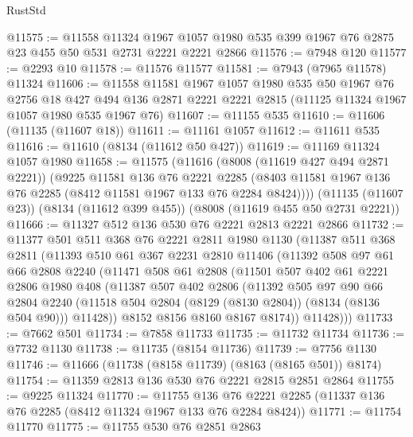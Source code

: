 \begin{lexlean}{RustStd}
\begin{coremodule}
@11575 := @11558
    @11324
    @1967
    @1057
    @1980
    @535
    @399
    @1967
    @76
    @2875
    @23
    @455
    @50
    @531
    @2731
    @2221
    @2221
    @2866
@11576 := @7948 @120
@11577 := @2293 @10
@11578 := @11576 @11577
@11581 := @7943 (@7965 @11578) @11324
@11606 := @11558
    @11581
    @1967
    @1057
    @1980
    @535
    @50
    @1967
    @76
    @2756
    @18
    @427
    @494
    @136
    @2871
    @2221
    @2221
    @2815
    (@11125 @11324 @1967 @1057 @1980 @535 @1967 @76)
@11607 := @11155 @535
@11610 := @11606 (@11135 (@11607 @18))
@11611 := @11161 @1057
@11612 := @11611 @535
@11616 := @11610 (@8134 (@11612 @50 @427))
@11619 := @11169 @11324 @1057 @1980
@11658 := @11575
    (@11616
      (@8008 (@11619 @427 @494 @2871 @2221))
      (@9225
        @11581
        @136
        @76
        @2221
        @2285
        (@8403 @11581 @1967 @136 @76 @2285 (@8412 @11581 @1967 @133 @76 @2284 @8424))))
    (@11135 (@11607 @23))
    (@8134 (@11612 @399 @455))
    (@8008 (@11619 @455 @50 @2731 @2221))
@11666 := @11327 @512 @136 @530 @76 @2221 @2813 @2221 @2866
@11732 := @11377
    @501
    @511
    @368
    @76
    @2221
    @2811
    @1980
    @1130
    (@11387
      @511
      @368
      @2811
      (@11393
        @510
        @61
        @367
        @2231
        @2810
        @11406
        (@11392
          @508
          @97
          @61
          @66
          @2808
          @2240
          (@11471
            @508
            @61
            @2808
            (@11501
              @507
              @402
              @61
              @2221
              @2806
              @1980
              @408
              (@11387
                @507
                @402
                @2806
                (@11392
                  @505
                  @97
                  @90
                  @66
                  @2804
                  @2240
                  (@11518 @504 @2804 (@8129 (@8130 @2804)) (@8134 (@8136 @504 @90)))
                  @11428))
              @8152
              @8156
              @8160
              @8167
              @8174))
          @11428)))
@11733 := @7662 @501
@11734 := @7858 @11733
@11735 := @11732 @11734
@11736 := @7732 @1130
@11738 := @11735 (@8154 @11736)
@11739 := @7756 @1130
@11746 := @11666 (@11738 (@8158 @11739) (@8163 (@8165 @501)) @8174)
@11754 := @11359 @2813 @136 @530 @76 @2221 @2815 @2851 @2864
@11755 := @9225 @11324
@11770 := @11755
    @136
    @76
    @2221
    @2285
    (@11337 @136 @76 @2285 (@8412 @11324 @1967 @133 @76 @2284 @8424))
@11771 := @11754 @11770
@11775 := @11755 @530 @76 @2851 @2863

\end{coremodule}
\end{lexlean}
